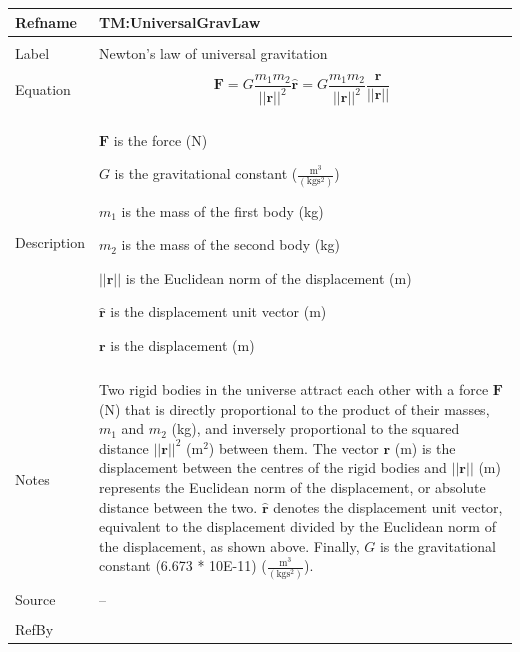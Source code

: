 \documentclass[12pt]{article}
\begin{document}
\noindent \begin{minipage}{\textwidth}
\begin{tabular}{p{} p{}}
\toprule \textbf{Refname} & \textbf{TM:UniversalGravLaw}
\label{TM:UniversalGravLaw}
\\ \midrule \\
Label & Newton's law of universal gravitation
\\ \midrule \\
Equation & \begin{displaymath}
           \mathbf{F}=G \frac{{m_{1}} {m_{2}}}{||\mathbf{r}||^{2}} \mathbf{\hat{r}}=G \frac{{m_{1}} {m_{2}}}{||\mathbf{r}||^{2}} \frac{\mathbf{r}}{||\mathbf{r}||}
           \end{displaymath}
\\ \midrule \\
Description & \begin{symbDescription}
              \item{$\mathbf{F}$ is the force (N)}
              \item{$G$ is the gravitational constant ($\frac{\text{m}^{3}}{(\text{kg}\text{s}^{2})}$)}
              \item{${m_{1}}$ is the mass of the first body (kg)}
              \item{${m_{2}}$ is the mass of the second body (kg)}
              \item{$||\mathbf{r}||$ is the Euclidean norm of the displacement (m)}
              \item{$\mathbf{\hat{r}}$ is the displacement unit vector (m)}
              \item{$\mathbf{r}$ is the displacement (m)}
              \end{symbDescription}
\\ \midrule \\
Notes & Two rigid bodies in the universe attract each other with a force $\mathbf{F}$ (N) that is directly proportional to the product of their masses, ${m_{1}}$ and ${m_{2}}$ (kg), and inversely proportional to the squared distance ${||\mathbf{r}||^{2}}$ ($\text{m}^{2}$) between them. The vector $\mathbf{r}$ (m) is the displacement between the centres of the rigid bodies and $||\mathbf{r}||$ (m) represents the Euclidean norm of the displacement, or absolute distance between the two. $\mathbf{\hat{r}}$ denotes the displacement unit vector, equivalent to the displacement divided by the Euclidean norm of the displacement, as shown above. Finally, $G$ is the gravitational constant (6.673 * 10E-11) ($\frac{\text{m}^{3}}{(\text{kg}\text{s}^{2})}$).
\\ \midrule \\
Source & --
\\ \midrule \\
RefBy & 
\\ \bottomrule \end{tabular}
\end{minipage}
\par~
\end{document}
